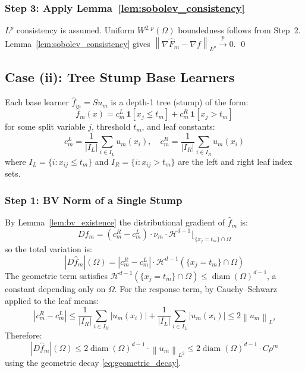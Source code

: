 \documentclass[12pt]{article}
\newcommand{\norm}[1]{\left\| #1 \right\|}
\newcommand{\Wtwop}{W^{2,p}(\Omega)}
\newcommand{\xrightarrowp}{\xrightarrow{p}}
\begin{document}
	\subsubsection*{Step 3: Apply Lemma~\ref{lem:sobolev_consistency}}
	
	$L^p$ consistency is assumed. Uniform $\Wtwop$ boundedness follows from Step~2.
	Lemma~\ref{lem:sobolev_consistency} gives
	$\norm{\nabla \hat{F}_m - \nabla f}_{L^p} \xrightarrowp 0$. \qed
	
	\subsection{Case (ii): Tree Stump Base Learners}
	
	Each base learner $\hat{f}_m = Su_m$ is a depth-1 tree (stump) of the form:
	\begin{equation}
		\hat{f}_m(x) = c_m^L \,\mathbf{1}[x_j \leq t_m] + c_m^R \,\mathbf{1}[x_j > t_m]
	\end{equation}
	for some split variable $j$, threshold $t_m$, and leaf constants:
	\begin{equation}
		c_m^L = \frac{1}{|I_L|}\sum_{i \in I_L} u_m(x_i), \quad
		c_m^R = \frac{1}{|I_R|}\sum_{i \in I_R} u_m(x_i)
	\end{equation}
	where $I_L = \{i : x_{ij} \leq t_m\}$ and $I_R = \{i : x_{ij} > t_m\}$ are the
	left and right leaf index sets.
	
	\subsubsection*{Step 1: BV Norm of a Single Stump}
	
	By Lemma~\ref{lem:bv_existence} the distributional gradient of $\hat{f}_m$ is:
	\begin{equation}
		D\hat{f}_m = (c_m^R - c_m^L) \cdot \nu_m \cdot
		\mathcal{H}^{d-1}\lfloor_{\{x_j = t_m\} \cap \Omega}
	\end{equation}
	so the total variation is:
	\begin{equation}
		|D\hat{f}_m|(\Omega) =
		|c_m^R - c_m^L| \cdot
		\mathcal{H}^{d-1}\!\left(\{x_j = t_m\} \cap \Omega\right)
	\end{equation}
	The geometric term satisfies
	$\mathcal{H}^{d-1}(\{x_j = t_m\} \cap \Omega) \leq \operatorname{diam}(\Omega)^{d-1}$,
	a constant depending only on $\Omega$. For the response term, by Cauchy--Schwarz
	applied to the leaf means:
	\begin{equation}
		|c_m^R - c_m^L|
		\leq \frac{1}{|I_R|}\sum_{i \in I_R} |u_m(x_i)|
		+ \frac{1}{|I_L|}\sum_{i \in I_L} |u_m(x_i)|
		\leq 2\norm{u_m}_{L^2}
	\end{equation}
	Therefore:
	\begin{equation}
		|D\hat{f}_m|(\Omega)
		\leq 2\operatorname{diam}(\Omega)^{d-1} \cdot \norm{u_m}_{L^2}
		\leq 2\operatorname{diam}(\Omega)^{d-1} \cdot C\rho^m
	\end{equation}
	using the geometric decay \eqref{eq:geometric_decay}.
	
\end{document}
